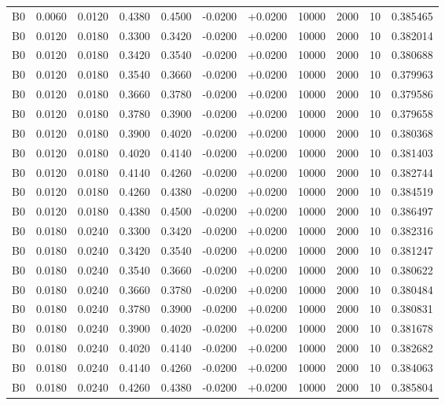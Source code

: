 \documentclass{article}
\begin{document}
\begin{longtable}{l r r r r r r r r r l}
B0 & 0.0060 & 0.0120 & 0.4380 & 0.4500 & -0.0200 & +0.0200 & 10000 & 2000 & 10 & 0.385465 \\
B0 & 0.0120 & 0.0180 & 0.3300 & 0.3420 & -0.0200 & +0.0200 & 10000 & 2000 & 10 & 0.382014 \\
B0 & 0.0120 & 0.0180 & 0.3420 & 0.3540 & -0.0200 & +0.0200 & 10000 & 2000 & 10 & 0.380688 \\
B0 & 0.0120 & 0.0180 & 0.3540 & 0.3660 & -0.0200 & +0.0200 & 10000 & 2000 & 10 & 0.379963 \\
B0 & 0.0120 & 0.0180 & 0.3660 & 0.3780 & -0.0200 & +0.0200 & 10000 & 2000 & 10 & 0.379586 \\
B0 & 0.0120 & 0.0180 & 0.3780 & 0.3900 & -0.0200 & +0.0200 & 10000 & 2000 & 10 & 0.379658 \\
B0 & 0.0120 & 0.0180 & 0.3900 & 0.4020 & -0.0200 & +0.0200 & 10000 & 2000 & 10 & 0.380368 \\
B0 & 0.0120 & 0.0180 & 0.4020 & 0.4140 & -0.0200 & +0.0200 & 10000 & 2000 & 10 & 0.381403 \\
B0 & 0.0120 & 0.0180 & 0.4140 & 0.4260 & -0.0200 & +0.0200 & 10000 & 2000 & 10 & 0.382744 \\
B0 & 0.0120 & 0.0180 & 0.4260 & 0.4380 & -0.0200 & +0.0200 & 10000 & 2000 & 10 & 0.384519 \\
B0 & 0.0120 & 0.0180 & 0.4380 & 0.4500 & -0.0200 & +0.0200 & 10000 & 2000 & 10 & 0.386497 \\
B0 & 0.0180 & 0.0240 & 0.3300 & 0.3420 & -0.0200 & +0.0200 & 10000 & 2000 & 10 & 0.382316 \\
B0 & 0.0180 & 0.0240 & 0.3420 & 0.3540 & -0.0200 & +0.0200 & 10000 & 2000 & 10 & 0.381247 \\
B0 & 0.0180 & 0.0240 & 0.3540 & 0.3660 & -0.0200 & +0.0200 & 10000 & 2000 & 10 & 0.380622 \\
B0 & 0.0180 & 0.0240 & 0.3660 & 0.3780 & -0.0200 & +0.0200 & 10000 & 2000 & 10 & 0.380484 \\
B0 & 0.0180 & 0.0240 & 0.3780 & 0.3900 & -0.0200 & +0.0200 & 10000 & 2000 & 10 & 0.380831 \\
B0 & 0.0180 & 0.0240 & 0.3900 & 0.4020 & -0.0200 & +0.0200 & 10000 & 2000 & 10 & 0.381678 \\
B0 & 0.0180 & 0.0240 & 0.4020 & 0.4140 & -0.0200 & +0.0200 & 10000 & 2000 & 10 & 0.382682 \\
B0 & 0.0180 & 0.0240 & 0.4140 & 0.4260 & -0.0200 & +0.0200 & 10000 & 2000 & 10 & 0.384063 \\
B0 & 0.0180 & 0.0240 & 0.4260 & 0.4380 & -0.0200 & +0.0200 & 10000 & 2000 & 10 & 0.385804 \\

\end{longtable}
\end{document}
